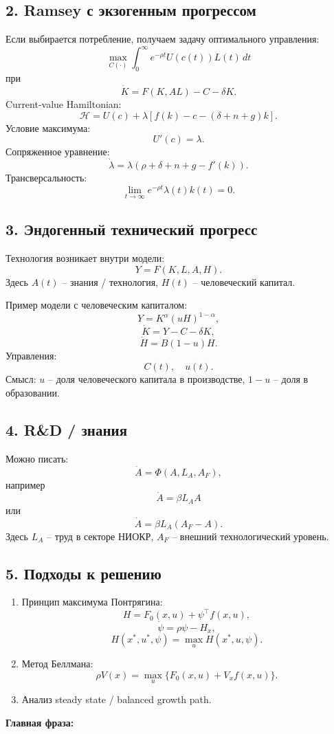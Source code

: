 \documentclass[12pt,a4paper]{article}
\begin{document}
\subsection*{2. Ramsey с экзогенным прогрессом}
Если выбирается потребление, получаем задачу оптимального управления:
\[
\max_{C(\cdot)}\int_0^\infty e^{-\rho t}U(c(t))L(t)\,dt
\]
при
\[
\dot K=F(K,AL)-C-\delta K.
\]
Current-value Hamiltonian:
\[
\mathcal H=U(c)+\lambda[f(k)-c-(\delta+n+g)k].
\]
Условие максимума:
\[
U'(c)=\lambda.
\]
Сопряженное уравнение:
\[
\dot\lambda=\lambda(\rho+\delta+n+g-f'(k)).
\]
Трансверсальность:
\[
\lim_{t\to\infty}e^{-\rho t}\lambda(t)k(t)=0.
\]

\subsection*{3. Эндогенный технический прогресс}
Технология возникает внутри модели:
\[
Y=F(K,L,A,H).
\]
Здесь $A(t)$ -- знания / технология, $H(t)$ -- человеческий капитал.

Пример модели с человеческим капиталом:
\[
Y=K^\alpha(uH)^{1-\alpha},
\]
\[
\dot K=Y-C-\delta K,
\]
\[
\dot H=B(1-u)H.
\]
Управления:
\[
C(t),\quad u(t).
\]
Смысл: $u$ -- доля человеческого капитала в производстве, $1-u$ -- доля в образовании.

\subsection*{4. R\&D / знания}
Можно писать:
\[
\dot A=\Phi(A,L_A,A_F),
\]
например
\[
\dot A=\beta L_AA
\]
или
\[
\dot A=\beta L_A(A_F-A).
\]
Здесь $L_A$ -- труд в секторе НИОКР, $A_F$ -- внешний технологический уровень.

\subsection*{5. Подходы к решению}
\begin{enumerate}
\item Принцип максимума Понтрягина:
\[
H=F_0(x,u)+\psi^\top f(x,u),
\]
\[
\dot\psi=\rho\psi-H_x,
\]
\[
H(x^*,u^*,\psi)=\max_u H(x^*,u,\psi).
\]
\item Метод Беллмана:
\[
\rho V(x)=\max_u\{F_0(x,u)+V_xf(x,u)\}.
\]
\item Анализ steady state / balanced growth path.
\end{enumerate}

\textbf{Главная фраза:}
\begin{center}
\end{center}
\end{document}
